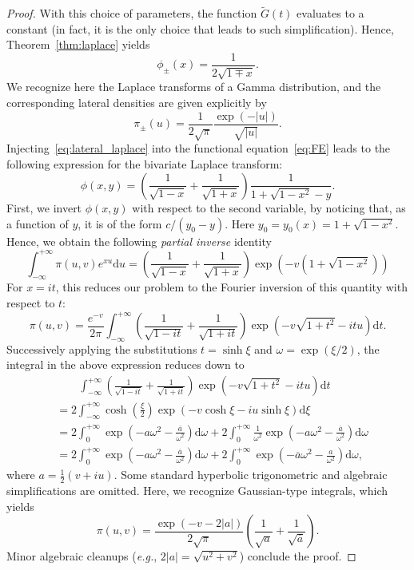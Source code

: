 \documentclass[10pt,a4paper]{amsart}
\begin{document}
\begin{proof}
    With this choice of parameters, the function $\widetilde{G}(t)$ evaluates to a constant (in fact, it is the only choice that leads to such simplification). Hence, Theorem~\ref{thm:laplace} yields 
    \begin{equation}\label{eq:lateral_laplace}
        \phi_\pm(x)=\frac{1}{2\sqrt{1\mp x}}.
    \end{equation}
    We recognize here the Laplace transforms of a Gamma distribution, and the corresponding lateral densities are given explicitly by
    $$\pi_\pm(u)=\frac{1}{2\sqrt{\pi}}\frac{\exp(-|u|)}{\sqrt{|u|}}.$$
    Injecting~\eqref{eq:lateral_laplace} into the functional equation~\eqref{eq:FE} leads to the following expression for the bivariate Laplace transform:
    \begin{equation}\label{eq:laplace_symmetric}
    \phi(x,y)=\left(\frac{1}{\sqrt{1-x}}+\frac{1}{\sqrt{1+x}}\right)\frac{1}{1+\sqrt{1-x^2}-y}.
    \end{equation}
    First, we invert $\phi(x,y)$ with respect to the second variable, by noticing that, as a function of $y$, it is of the form $c/(y_0-y)$. Here $y_0= y_0(x)=1+\sqrt{1-x^2}$. Hence, we obtain the following \textit{partial inverse} identity
    \begin{equation*}
        \int_{-\infty}^{+\infty}\pi(u,v)e^{xu}\mathrm{d}u=\left(\frac{1}{\sqrt{1-x}}+\frac{1}{\sqrt{1+x}}\right)\exp\left(-v\left(1+\sqrt{1-x^2}\right)\right)
    \end{equation*}
    For $x=it$, this reduces our problem to the Fourier inversion of this quantity with respect to $t$:
    $$\pi(u,v)=\frac{e^{-v}}{2\pi}\int_{-\infty}^{+\infty}\left(\frac{1}{\sqrt{1-it}}+\frac{1}{\sqrt{1+it}}\right)\exp\left(-v\sqrt{1+t^2}-itu\right)\mathrm{d}t.$$
    Successively applying the substitutions $t=\sinh \xi$ and $\omega=\exp(\xi/2)$, the integral in the above expression reduces down to
    \begin{align*}
        &\quad\!\quad\int_{-\infty}^{+\infty}\left(\frac{1}{\sqrt{1-it}}+\frac{1}{\sqrt{1+it}}\right)\exp\left(-v\sqrt{1+t^2}-itu\right)\mathrm{d}t\\
        &=2\int_{-\infty}^{+\infty}\cosh\left(\frac{\xi}{2}\right)\exp\left(-v\cosh \xi -iu\sinh \xi\right)\mathrm{d}\xi\\
        &=2\int_0^{+\infty}\exp\left(-a\omega^2-\frac{\overline{a}}{\omega^2}\right)\mathrm{d}\omega+2\int_0^{+\infty}\frac{1}{\omega^2}\exp\left(-a\omega^2-\frac{\overline{a}}{\omega^2}\right)\mathrm{d}\omega\\
        &=2\int_0^{+\infty}\exp\left(-a\omega^2-\frac{\overline{a}}{\omega^2}\right)\mathrm{d}\omega+2\int_0^{+\infty}\exp\left(-\overline{a}\omega^2-\frac{a}{\omega^2}\right)\mathrm{d}\omega,
    \end{align*}
    where $a=\frac12(v+iu)$. Some standard hyperbolic trigonometric and algebraic simplifications are omitted. Here, we recognize Gaussian-type integrals, which yields
    $$\pi(u,v)=\frac{\exp(-v-2|a|)}{2\sqrt{\pi}}\left(\frac{1}{\sqrt{a}}+\frac{1}{\sqrt{\overline{a}}}\right).$$
    Minor algebraic cleanups (\textit{e.g.}, $2|a|=\sqrt{u^2+v^2}$) conclude the proof.
\end{proof}
\end{document}
